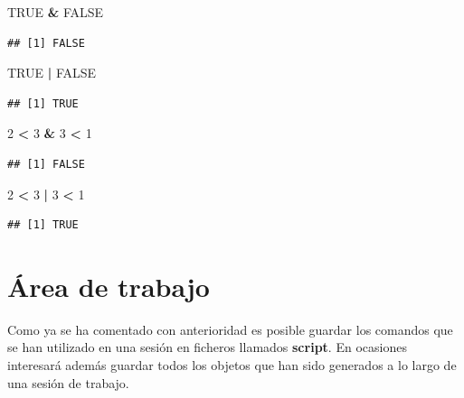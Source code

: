 \documentclass[]{book}
\newenvironment{Shaded}{\begin{snugshade}}{\end{snugshade}}
\newcommand{\DecValTok}[1]{\textcolor[rgb]{0.00,0.00,0.81}{#1}}
\newcommand{\OperatorTok}[1]{\textcolor[rgb]{0.81,0.36,0.00}{\textbf{#1}}}
\newcommand{\OtherTok}[1]{\textcolor[rgb]{0.56,0.35,0.01}{#1}}
\newcommand{\StringTok}[1]{\textcolor[rgb]{0.31,0.60,0.02}{#1}}
\begin{document}
\begin{Shaded}
\begin{Highlighting}[]
\OtherTok{TRUE} \OperatorTok{&}\StringTok{ }\OtherTok{FALSE}
\end{Highlighting}
\end{Shaded}

\begin{verbatim}
## [1] FALSE
\end{verbatim}

\begin{Shaded}
\begin{Highlighting}[]
\OtherTok{TRUE} \OperatorTok{|}\StringTok{ }\OtherTok{FALSE}
\end{Highlighting}
\end{Shaded}

\begin{verbatim}
## [1] TRUE
\end{verbatim}

\begin{Shaded}
\begin{Highlighting}[]
\DecValTok{2} \OperatorTok{<}\StringTok{ }\DecValTok{3} \OperatorTok{&}\StringTok{ }\DecValTok{3} \OperatorTok{<}\StringTok{ }\DecValTok{1}
\end{Highlighting}
\end{Shaded}

\begin{verbatim}
## [1] FALSE
\end{verbatim}

\begin{Shaded}
\begin{Highlighting}[]
\DecValTok{2} \OperatorTok{<}\StringTok{ }\DecValTok{3} \OperatorTok{|}\StringTok{ }\DecValTok{3} \OperatorTok{<}\StringTok{ }\DecValTok{1}
\end{Highlighting}
\end{Shaded}

\begin{verbatim}
## [1] TRUE
\end{verbatim}

\hypertarget{area-de-trabajo}{%
\section{Área de trabajo}\label{area-de-trabajo}}

Como ya se ha comentado
con anterioridad es posible guardar los comandos que se han utilizado en
una sesión en ficheros llamados \textbf{script}. En ocasiones interesará
además guardar todos los objetos que han sido generados a lo largo de
una sesión de trabajo.
\end{document}
